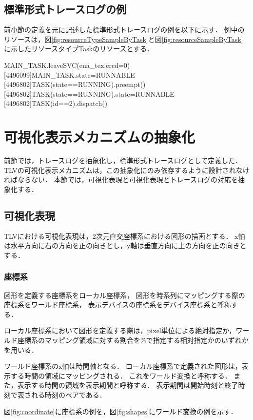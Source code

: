 \subsection{標準形式トレースログの例}

前小節の定義を元に記述した標準形式トレースログの例を以下に示す．
例中のリソースは，図\ref{fig:resourceTypeSampleByTask}と図\ref{fig:resourceSampleByTask}に示したリソースタイプTaskのリソースとする．

\begin{EBNF}
[2403010]MAIN_TASK.leaveSVC(ena_tex,ercd=0)
[4496099]MAIN_TASK.state=RUNNABLE
[4496802]TASK(state==RUNNING).preempt()
[4496802]TASK(state==RUNNING).state=RUNNABLE
[4496802]TASK(id==2).dispatch()
\end{EBNF}

\section{可視化表示メカニズムの抽象化}

前節では，トレースログを抽象化し，標準形式トレースログとして定義した．
TLVの可視化表示メカニズムは，この抽象化にのみ依存するように設計されなければならない．
本節では，可視化表現と可視化表現とトレースログの対応を抽象化する．

\subsection{可視化表現}

TLVにおける可視化表現は，2次元直交座標系における図形の描画とする．
x軸は水平方向に右の方向を正の向きとし，y軸は垂直方向に上の方向を正の向きとする．

\subsubsection{座標系}
図形を定義する座標系をローカル座標系，
図形を時系列にマッピングする際の座標系をワールド座標系，
表示デバイスの座標系をデバイス座標系と呼称する．

ローカル座標系において図形を定義する際は，pixel単位による絶対指定か，ワールド座標系のマッピング領域に対する割合を\%で指定する相対指定かのいずれかを用いる．

ワールド座標系のx軸は時間軸となる．
ローカル座標系で定義された図形は，表示する時間の領域にマッピングされる．
これをワールド変換と呼称する．
また，表示する時間の領域を表示期間と呼称する．
表示期間は開始時刻と終了時刻で表される時刻のペアである．

図\ref{fig:coordinate}に座標系の例を，図\ref{fig:shapes}にワールド変換の例を示す．

